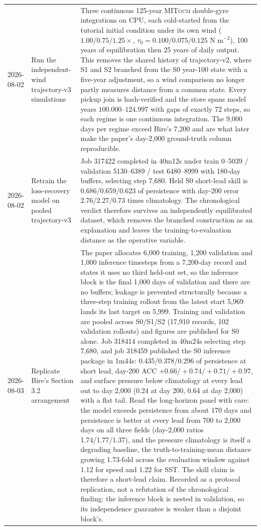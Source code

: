 \documentclass[11pt]{article}
\newcommand{\MITgcm}{\textsc{MITgcm}}
\begin{document}
\begin{longtable}{@{}p{}p{}p{}@{}}
2026-08-02 & Run the independent-wind trajectory-v3 simulations & Three continuous 125-year \MITgcm{} double-gyre integrations on CPU, each cold-started from the tutorial initial condition under its own wind ($1.00/0.75/1.25\times$, $\tau_0=0.100/0.075/0.125$ N m$^{-2}$), 100 years of equilibration then 25 years of daily output.  This removes the shared history of trajectory-v2, where S1 and S2 branched from the S0 year-100 state with a five-year adjustment, so a wind comparison no longer partly measures distance from a common state.  Every pickup join is hash-verified and the store spans model years $100.000$--$124.997$ with gaps of exactly 72 steps, so each regime is one continuous integration.  The 9,000 days per regime exceed Bire's 7,200 and are what later make the paper's day-2,000 ground-truth column reproducible. \\
2026-08-02 & Retrain the loss-recovery model on pooled trajectory-v3 & Job 317422 completed in 40m12s under train 0--5039 / validation 5130--6389 / test 6480--8999 with 180-day buffers, selecting step 7,680.  Held S0 short-lead skill is 0.686/0.659/0.623 of persistence with day-200 error $2.76/2.27/0.73$ times climatology.  The chronological verdict therefore survives an independently equilibrated dataset, which removes the branched construction as an explanation and leaves the training-to-evaluation distance as the operative variable. \\
2026-08-03 & Replicate Bire's Section 3.2 arrangement & The paper allocates 6,000 training, 1,200 validation and 1,000 inference timesteps from a 7,200-day record and states it uses no third held-out set, so the inference block is the final 1,000 days of validation and there are no buffers; leakage is prevented structurally because a three-step training rollout from the latest start 5,969 lands its last target on 5,999.  Training and validation are pooled across S0/S1/S2 (17,910 records, 102 validation rollouts) and figures are published for S0 alone.  Job 318414 completed in 40m24s selecting step 7,680, and job 318459 published the S0 inference package in 1m44s: 0.435/0.378/0.296 of persistence at short lead, day-200 ACC $+0.66/+0.74/+0.71/+0.97$, and surface pressure below climatology at every lead out to day 2,000 (0.24 at day 200, 0.64 at day 2,000) with a flat tail.  Read the long-horizon panel with care: the model exceeds persistence from about 170 days and persistence is better at every lead from 700 to 2,000 days on all three fields (day-2,000 ratios 1.74/1.77/1.37), and the pressure climatology is itself a degrading baseline, the truth-to-training-mean distance growing 1.73-fold across the evaluation window against 1.12 for speed and 1.22 for SST.  The skill claim is therefore a short-lead claim.  Recorded as a protocol replication, not a refutation of the chronological finding: the inference block is nested in validation, so its independence guarantee is weaker than a disjoint block's. \\

\end{longtable}
\end{document}
